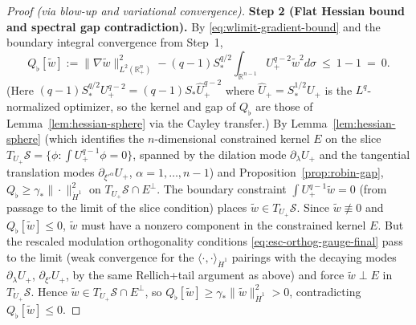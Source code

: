 \documentclass[11pt,reqno,a4paper]{amsart}
\newcommand{\R}{\mathbb{R}}
\numberwithin{equation}{section}
\theoremstyle{plain}
\theoremstyle{remark}
\theoremstyle{plain}
\begin{document}
\begin{proof}[Proof (via blow-up and variational convergence)]
\smallskip\noindent\textbf{Step 2 (Flat Hessian bound and spectral gap contradiction).}
By \eqref{eq:wlimit-gradient-bound} and the boundary integral convergence from Step~1,
\[
Q_\flat[\widetilde w]
:=\|\nabla\widetilde w\|_{L^2(\R^n_+)}^2
  -(q-1)S_\ast^{q/2}\int_{\R^{n-1}}U_+^{q-2}\widetilde w^2d\sigma
\ \le\ 1-1\ =\ 0.
\]
(Here $(q-1)S_\ast^{q/2}U_+^{q-2}=(q-1)S_\ast\hat U_+^{q-2}$
where $\hat U_+=S_\ast^{1/2}U_+$ is the $L^q$-normalized optimizer,
so the kernel and gap of $Q_\flat$ are those of
Lemma~\ref{lem:hessian-sphere} via the Cayley transfer.)
By Lemma~\ref{lem:hessian-sphere}
(which identifies the $n$-dimensional constrained kernel $E$
on the slice $T_{U_+}\mathcal S=\{\phi:\int U_+^{q-1}\phi=0\}$,
spanned by the dilation mode $\partial_\lambda U_+$ and the
tangential translation modes $\partial_{\xi'^\alpha}U_+$,
$\alpha=1,\dots,n-1$)
and Proposition~\ref{prop:robin-gap},
$Q_\flat\ge\gamma_\ast\|\cdot\|_{\dot H^1}^2$
on $T_{U_+}\mathcal S\cap E^\perp$.
The boundary constraint $\int U_+^{q-1}\widetilde w=0$
(from passage to the limit of the slice condition)
places $\widetilde w\in T_{U_+}\mathcal S$.
Since $\widetilde w\not\equiv0$ and
$Q_\flat[\widetilde w]\le0$,
$\widetilde w$ must have a nonzero component in the
constrained kernel $E$.
But the rescaled modulation orthogonality conditions
\eqref{eq:esc-orthog-gauge-final} pass to the limit
(weak convergence for the $\langle\cdot,\cdot\rangle_{\dot H^1}$
pairings with the decaying modes $\partial_\lambda U_+$,
$\partial_{\xi'}U_+$,
by the same Rellich+tail argument as above) and force
$\widetilde w\perp E$ in $T_{U_+}\mathcal S$.
Hence $\widetilde w\in T_{U_+}\mathcal S\cap E^\perp$, so
$Q_\flat[\widetilde w]\ge\gamma_\ast\|\widetilde w\|_{\dot H^1}^2>0$,
contradicting $Q_\flat[\widetilde w]\le0$.
\end{proof}
\end{document}
